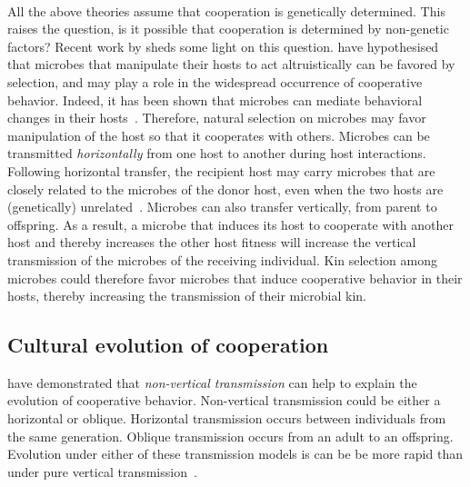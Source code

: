 \documentclass[12pt]{extarticle}
\begin{document}
\paragraph{}
All the above theories assume that cooperation is genetically determined. This raises the question, is it possible that cooperation is determined by non-genetic factors?
Recent work by \citet{lewin2017microbes} sheds some light on this question. 
\citet{lewin2017microbes} have hypothesised that microbes that manipulate their hosts to act altruistically can be favored by selection, and may play a role in the widespread occurrence of cooperative behavior. Indeed, it has been shown that microbes can mediate behavioral changes in their hosts~\citep{poulin2010parasite,dobson1988population}. Therefore, natural selection on microbes may favor manipulation of the host so that it cooperates with others. Microbes can be transmitted \emph{horizontally} from one host to another during host interactions. Following horizontal transfer, the recipient host may carry microbes that are closely related to the microbes of the donor host, even when the two hosts are (genetically) unrelated~\citep{lewin2017microbes}. Microbes can also transfer vertically, from parent to offspring. %
As a result, a microbe that induces its host to cooperate with another host and thereby increases the other host fitness will  increase the vertical transmission of the microbes of the receiving individual. Kin selection among microbes could therefore favor microbes that induce cooperative behavior in their hosts, thereby increasing the transmission of their microbial kin.

\subsection*{Cultural evolution of cooperation}
\citet{lewin2017microbes} have demonstrated that \emph{non-vertical transmission} can help to explain the evolution of cooperative behavior. 
Non-vertical transmission could be either a horizontal or oblique. Horizontal transmission occurs between individuals from the same generation. Oblique transmission occurs from an adult to an offspring. 
Evolution under either of these transmission models is can be be more rapid than under pure vertical transmission~\citep{ram2018evolution}. %
\end{document}
